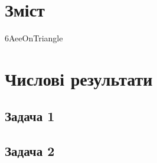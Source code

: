 \documentclass[a4paper,oneside]{article}
\begin{document}
	\pagestyle{empty} %

	

	\linespread{1.75}
	\selectfont
	\addtocounter{page}{1}

	\section*{Зміст}

	\makeatletter
	\makeatother

	\newpage
	\pagestyle{plain}

	
	
	
	
	
	{6AeeOnTriangle}
	

	\section{Числові результати}
		\subsection{Задача 1}
		\subsection{Задача 2}
\end{document}
